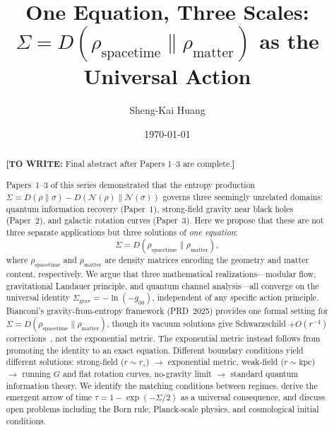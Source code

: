 \documentclass[prl,twocolumn,superscriptaddress,longbibliography,floatfix]{revtex4-2}
\newcommand{\chan}{\mathcal{N}}
\newcommand{\tauasym}{\tau}
\newcommand{\towrite}[1]{{\color{blue}\textbf{[TO WRITE:} #1\textbf{]}}}
\begin{document}
\title{One Equation, Three Scales:\\
$\Sigma = D(\rho_{\mathrm{spacetime}} \| \rho_{\mathrm{matter}})$
as the Universal Action}

\author{Sheng-Kai Huang}

\date{\today}

\begin{abstract}
\towrite{Final abstract after Papers 1--3 are complete.}

Papers~1--3 of this series demonstrated that the entropy production
$\Sigma = D(\rho\|\sigma) - D(\chan(\rho)\|\chan(\sigma))$ governs
three seemingly unrelated domains: quantum information recovery
(Paper~1), strong-field gravity near black holes (Paper~2), and
galactic rotation curves (Paper~3). Here we propose that these are
not three separate applications but three solutions of
\emph{one equation}:
\begin{equation*}
\Sigma = D(\rho_{\mathrm{spacetime}} \| \rho_{\mathrm{matter}}),
\end{equation*}
where $\rho_{\mathrm{spacetime}}$ and $\rho_{\mathrm{matter}}$ are
density matrices encoding the geometry and matter content,
respectively. We argue that three mathematical
realizations---modular flow, gravitational Landauer principle, and
quantum channel analysis---all converge on the universal identity
$\Sigma_{\mathrm{grav}} = -\ln(-g_{00})$, independent of any
specific action principle. Bianconi's gravity-from-entropy framework
(PRD~2025) provides one formal setting for
$\Sigma = D(\rho_{\mathrm{spacetime}} \| \rho_{\mathrm{matter}})$,
though its vacuum solutions give Schwarzschild $+ O(r^{-4})$
corrections~\cite{Thattarampilly2026}, not the exponential metric.
The exponential metric instead follows from promoting the identity
to an exact equation. Different boundary conditions yield different
solutions: strong-field ($r \sim r_s$) $\to$ exponential metric,
weak-field ($r \sim \mathrm{kpc}$) $\to$ running $G$ and flat
rotation curves, no-gravity limit $\to$ standard quantum
information theory. We identify the matching conditions between
regimes, derive the emergent arrow of time
$\tauasym = 1 - \exp(-\Sigma/2)$ as a universal consequence,
and discuss open problems including the Born rule, Planck-scale
physics, and cosmological initial conditions.
\end{abstract}

\maketitle
\end{document}
